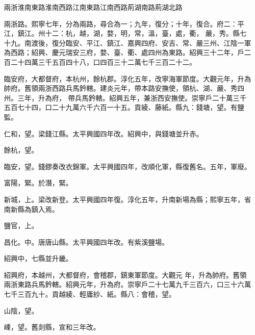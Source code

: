 
\begin{pinyinscope}

 兩浙淮南東路淮南西路江南東路江南西路荊湖南路荊湖北路



 兩浙路。熙寧七年，分為兩路，尋合為一；九年，復分；十年，復合。府二：平江，鎮江。州十二：杭，越，湖，婺，明，常，溫，臺，處，衢，
 嚴，秀。縣七十九。南渡後，復分臨安、平江、鎮江、嘉興四府、安吉、常、嚴三州、江陰一軍為西路；紹興、慶元瑞安三府，婺、臺、衢、處四州為東路。紹興三十二年，戶二百二十四萬三千五百四十八，口四百三十二萬七千三百二十二。



 臨安府，大都督府，本杭州，餘杭郡。淳化五年，改寧海軍節度。大觀元年，升為帥府。舊領兩浙西路兵馬鈐轄。建炎元年，帶本路安撫使，領杭、湖、嚴、秀四州。三年，升為府，
 帶兵馬鈐轄。紹興五年，兼浙西安撫使。崇寧戶二十萬三千五百七十四，口二十九萬六千六百一十五。貢綾、藤紙。縣九：錢塘，望。有鹽監。



 仁和，望。梁錢江縣。太平興國四年改。紹興中，與錢塘並升赤。



 餘杭，望。



 臨安，望。錢鏐奏改衣錦軍。太平興國四年，改順化軍，縣復舊名。五年，軍廢。



 富陽，緊。於潛，緊。



 新城，上。梁改新登。太平興國四年復。淳化五年，升南新場為縣；熙寧五年，省南新縣為鎮入焉。



 鹽官，上。



 昌化。中。唐唐山縣。太平興國四年改。有紫溪鹽場。



 紹興中，七縣並升畿。



 紹興府，本越州，大都督府，會稽郡，鎮東軍節度。大觀元
 年，升為帥府。舊領兩浙東路兵馬鈐轄。紹興元年，升為府。崇寧戶二十七萬九千三百六，口三十六萬七千三百九十。貢越綾、輕庸紗、紙。縣八：會稽，望。



 山陰，望。



 嵊，望。舊剡縣，宣和三年改。




\end{pinyinscope}

